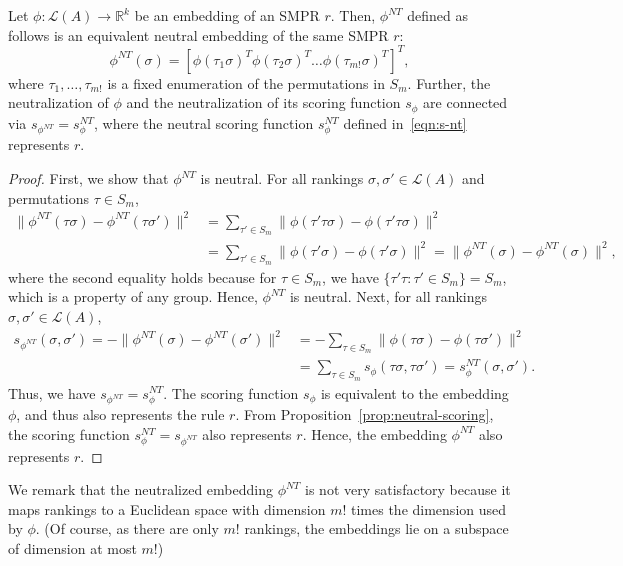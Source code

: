 \documentclass[prodmode,acmec]{ec-acmsmall}
\newcommand{\calL}{{\mathcal{L}}}
\newcommand{\rank}{{\calL(A)}}
\newcommand{\nt}{NT}
\begin{document}
\begin{lemma}
Let $\phi: \rank \to \mathbb{R}^k$ be an embedding of an SMPR $r$. Then, $\phi^{\nt}$ defined as follows is an equivalent neutral embedding of the same SMPR $r$: 
\begin{equation}
\phi^{\nt}(\sigma) = [\phi(\tau_1 \sigma)^T \phi(\tau_2 \sigma)^T \ldots \phi(\tau_{m!} \sigma)^T]^T,
\label{eqn:phi-nt}
\end{equation}
where $\tau_1,\ldots,\tau_{m!}$ is a fixed enumeration of the permutations in $S_m$. Further, the neutralization of $\phi$ and the neutralization of its scoring function $s_{\phi}$ are connected via $s_{\phi^{\nt}} = s ^{\nt}_{\phi}$, where the neutral scoring function $s ^{\nt}_{\phi}$ defined in~\eqref{eqn:s-nt} represents $r$. 
\label{lem:neutral-embedding}
\end{lemma}
\begin{proof}
First, we show that $\phi^{\nt}$ is neutral. For all rankings $\sigma,\sigma' \in \rank$ and permutations $\tau \in S_m$, 
\begin{align*}
\|\phi^{\nt}(\tau \sigma)-\phi^{\nt}(\tau \sigma')\|^2 &= \sum_{\tau' \in S_m} \|\phi(\tau' \tau \sigma)-\phi(\tau' \tau \sigma)\|^2 \\
&= \sum_{\tau' \in S_m} \|\phi(\tau' \sigma)-\phi(\tau' \sigma)\|^2 = \|\phi^{\nt}(\sigma)-\phi^{\nt}(\sigma)\|^2,
\end{align*}
where the second equality holds because for $\tau \in S_m$, we have $\{\tau' \tau : \tau' \in S_m\} = S_m$, which is a property of any group. Hence, $\phi^{\nt}$ is neutral. Next, for all rankings $\sigma,\sigma' \in \rank$, 
\begin{align*}
s_{\phi^{\nt}}(\sigma,\sigma') = -\|\phi^{\nt}(\sigma)-\phi^{\nt}(\sigma')\|^2 &= - \sum_{\tau \in S_m} \|\phi(\tau \sigma)-\phi(\tau \sigma')\|^2  \\
&= \sum_{\tau \in S_m} s_{\phi}(\tau \sigma,\tau \sigma') = s_{\phi}^{\nt}(\sigma,\sigma').
\end{align*}
Thus, we have $s_{\phi^{\nt}} = s_{\phi}^{\nt}$. The scoring function $s_{\phi}$ is equivalent to the embedding $\phi$, and thus also represents the rule $r$. From Proposition~\ref{prop:neutral-scoring}, the scoring function $s_{\phi}^{\nt} = s_{\phi^{\nt}}$ also represents $r$. Hence, the embedding $\phi^{\nt}$ also represents $r$. 
\end{proof}
%
We remark that the neutralized embedding $\phi^{\nt}$ is not very satisfactory because it maps rankings to a Euclidean space with dimension $m!$ times the dimension used by $\phi$. (Of course, as there are only $m!$ rankings, the embeddings lie on a subspace of dimension at most $m!$)
\end{document}
